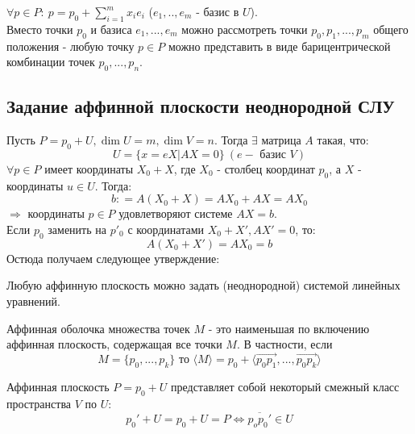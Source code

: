 $\forall p \in P: \ p = p_0 + \sum \limits_{i=1}^m x_ie_i$ ($e_1,..,e_m$ - базис в $U$).\\
Вместо точки $p_0$ и базиса $e_1,...,e_m$ можно рассмотреть точки $p_0,p_1,...,p_m$ общего положения - любую точку $p \in P$ можно представить в виде барицентрической комбинации точек $p_0,...,p_n$. 

\subsection*{Задание аффинной плоскости неоднородной СЛУ}
Пусть $P = p_0 + U, \dim U = m, \dim V = n$. Тогда $\exists$ матрица $A$ такая, что: 
$$U = \{x = eX | AX = 0\} \ (e - \text{ базис } V)$$
$\forall p \in P$ имеет координаты $X_0 + X$, где $X_0$ - столбец координат $p_0$, а $X$ - координаты $u \in U$.
Тогда:
$$b: = A(X_0 + X) = AX_0 + AX = AX_0 $$ 
$\Longrightarrow$ координаты $p \in P$ удовлетворяют системе $AX = b$.\\
Если $p_0$ заменить на $p'_0$ с координатами $X_0 + X', AX' = 0$, то: 
$$A(X_0 + X') = AX_0 = b$$ 
Остюда получаем следующее утверждение:
\begin{subtheorem}
    Любую аффинную плоскость можно задать (неоднородной) системой линейных уравнений.
\end{subtheorem}
\begin{definition}
    Аффинная оболочка множества точек $M$ - это наименьшая по включению аффинная плоскость, содержащая все точки $M$. В частности, если 
    $$M = \{p_0,...,p_k\} \text{ то }  \langle M \rangle = p_0 + \langle \overrightarrow{p_0p_1},...,\overrightarrow{p_0p_k} \rangle$$
\end{definition}

\begin{remark}
    Аффинная плоскость $P=p_0+U$ представляет собой некоторый смежный класс пространства $V$ по $U$:
    \[p_0'+U=p_0+U=P \Longleftrightarrow  \overline{p_op_0'}\in U\]
\end{remark}
